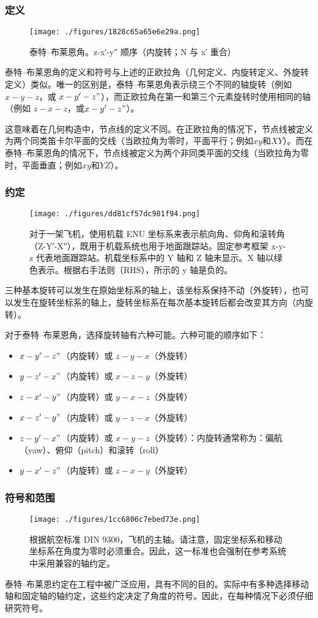 \subsubsection{定义}
\begin{figure}[ht]
\centering
\texttt{[image: ./figures/1828c65a65e6e29a.png]}
\caption{泰特–布莱恩角。z-x′-y″ 顺序（内旋转；N 与 x′ 重合）} \label{fig_OLJ_5}
\end{figure}
泰特–布莱恩角的定义和符号与上述的正欧拉角（几何定义、内旋转定义、外旋转定义）类似。唯一的区别是，泰特–布莱恩角表示绕三个不同的轴旋转（例如$x-y-z$，或 $x-y'-z"$），而正欧拉角在第一和第三个元素旋转时使用相同的轴（例如 $z-x-z$，或$x-y'-z"$）。

这意味着在几何构造中，节点线的定义不同。在正欧拉角的情况下，节点线被定义为两个同类笛卡尔平面的交线（当欧拉角为零时，平面平行；例如$xy$和$XY$）。而在泰特–布莱恩角的情况下，节点线被定义为两个非同类平面的交线（当欧拉角为零时，平面垂直；例如$xy$和$YZ$）。
\subsubsection{约定}
\begin{figure}[ht]
\centering
\texttt{[image: ./figures/dd81cf57dc981f94.png]}
\caption{对于一架飞机，使用机载 ENU 坐标系来表示航向角、仰角和滚转角（Z-Y′-X″），既用于机载系统也用于地面跟踪站。固定参考框架 x-y-z 代表地面跟踪站。机载坐标系中的 Y 轴和 Z 轴未显示。X 轴以绿色表示。根据右手法则（RHS），所示的 y 轴是负的。} \label{fig_OLJ_6}
\end{figure}
三种基本旋转可以发生在原始坐标系的轴上，该坐标系保持不动（外旋转），也可以发生在旋转坐标系的轴上，旋转坐标系在每次基本旋转后都会改变其方向（内旋转）。

对于泰特–布莱恩角，选择旋转轴有六种可能。六种可能的顺序如下：
\begin{itemize}
\item $x-y'-z"$（内旋转）或 $z-y-x$（外旋转）
\item $y-z'-x"$（内旋转）或 $x-z-y$（外旋转）
\item $z-x'-y"$（内旋转）或 $y-x-z$（外旋转）
\item $x-z'-y"$（内旋转）或 $y-z-x$（外旋转）
\item $z-y'-x"$（内旋转）或 $x-y-z$（外旋转）：内旋转通常称为：偏航（yaw）、俯仰（pitch）和滚转（roll）
\item $y-x'-z"$（内旋转）或 $z-x-y$（外旋转）
\end{itemize}
\subsubsection{符号和范围}
\begin{figure}[ht]
\centering
\texttt{[image: ./figures/1cc6806c7ebed73e.png]}
\caption{根据航空标准 DIN 9300，飞机的主轴。请注意，固定坐标系和移动坐标系在角度为零时必须重合。因此，这一标准也会强制在参考系统中采用兼容的轴约定。} \label{fig_OLJ_7}
\end{figure}
泰特–布莱恩约定在工程中被广泛应用，具有不同的目的。实际中有多种选择移动轴和固定轴的轴约定，这些约定决定了角度的符号。因此，在每种情况下必须仔细研究符号。

